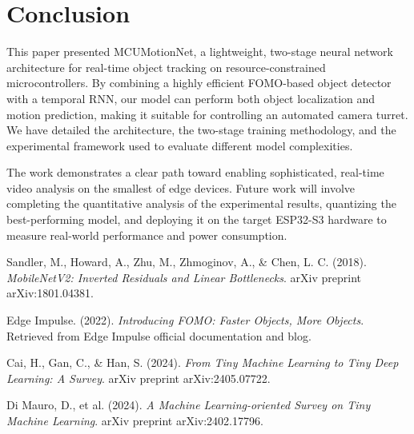 \documentclass{article}
\begin{document}
\section{Conclusion}

This paper presented MCUMotionNet, a lightweight, two-stage neural network architecture for real-time object tracking on resource-constrained microcontrollers. By combining a highly efficient FOMO-based object detector with a temporal RNN, our model can perform both object localization and motion prediction, making it suitable for controlling an automated camera turret. We have detailed the architecture, the two-stage training methodology, and the experimental framework used to evaluate different model complexities.

The work demonstrates a clear path toward enabling sophisticated, real-time video analysis on the smallest of edge devices. Future work will involve completing the quantitative analysis of the experimental results, quantizing the best-performing model, and deploying it on the target ESP32-S3 hardware to measure real-world performance and power consumption.

\begin{thebibliography}{9}

Sandler, M., Howard, A., Zhu, M., Zhmoginov, A., \& Chen, L. C. (2018).
\textit{MobileNetV2: Inverted Residuals and Linear Bottlenecks}.
arXiv preprint arXiv:1801.04381.

Edge Impulse. (2022).
\textit{Introducing FOMO: Faster Objects, More Objects}.
Retrieved from Edge Impulse official documentation and blog.

Cai, H., Gan, C., \& Han, S. (2024).
\textit{From Tiny Machine Learning to Tiny Deep Learning: A Survey}.
arXiv preprint arXiv:2405.07722.

Di Mauro, D., et al. (2024).
\textit{A Machine Learning-oriented Survey on Tiny Machine Learning}.
arXiv preprint arXiv:2402.17796.

\end{thebibliography}
\end{document}
